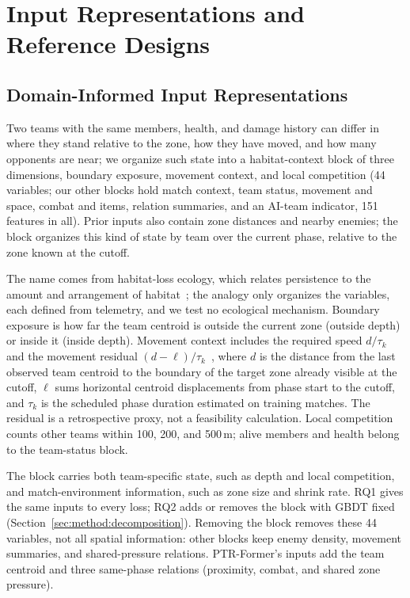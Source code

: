 \documentclass[sigconf,anonymous]{acmart}
\begin{document}
\section{Input Representations and Reference Designs}
\label{sec:method:design}
\subsection{Domain-Informed Input Representations}
\label{sec:method:representation}
Two teams with the same members, health, and damage history can differ in where they stand relative to the zone, how they have moved, and how many opponents are near; we organize such state into a habitat-context block of three dimensions, boundary exposure, movement context, and local competition (44 variables; our other blocks hold match context, team status, movement and space, combat and items, relation summaries, and an AI-team indicator, 151 features in all). Prior inputs also contain zone distances and nearby enemies; the block organizes this kind of state by team over the current phase, relative to the zone known at the cutoff.

The name comes from habitat-loss ecology, which relates persistence to the amount and arrangement of habitat~\cite{Fahrig03}; the analogy only organizes the variables, each defined from telemetry, and we test no ecological mechanism. Boundary exposure is how far the team centroid is outside the current zone (outside depth) or inside it (inside depth). Movement context includes the required speed $d/\tau_k$ and the movement residual $(d-\ell)/\tau_k$~\cite{Nathan08}, where $d$ is the distance from the last observed team centroid to the boundary of the target zone already visible at the cutoff, $\ell$ sums horizontal centroid displacements from phase start to the cutoff, and $\tau_k$ is the scheduled phase duration estimated on training matches. The residual is a retrospective proxy, not a feasibility calculation. Local competition counts other teams within 100, 200, and 500\,m; alive members and health belong to the team-status block.

The block carries both team-specific state, such as depth and local competition, and match-environment information, such as zone size and shrink rate. RQ1 gives the same inputs to every loss; RQ2 adds or removes the block with GBDT fixed (Section~\ref{sec:method:decomposition}). Removing the block removes these 44 variables, not all spatial information: other blocks keep enemy density, movement summaries, and shared-pressure relations. PTR-Former's inputs add the team centroid and three same-phase relations (proximity, combat, and shared zone pressure).
\end{document}
